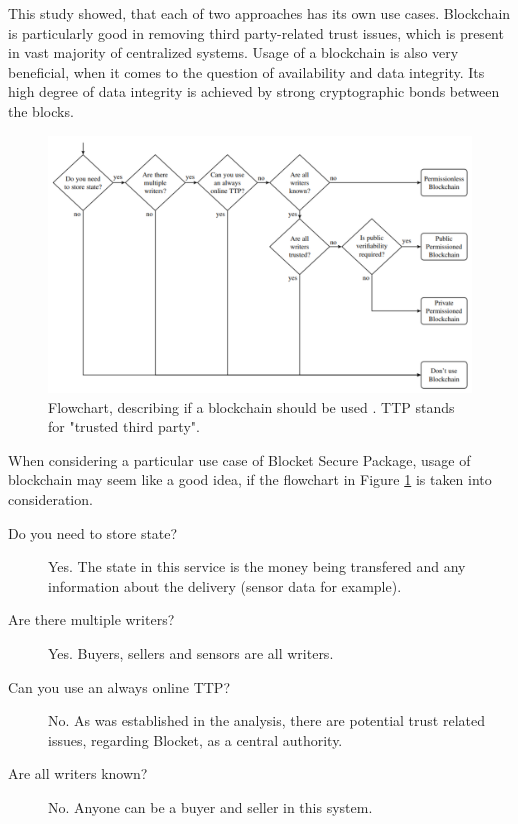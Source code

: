 This study showed, that each of two approaches has its own use cases. Blockchain is particularly good in removing third party-related trust issues, which is present in vast majority of centralized systems. Usage of a blockchain is also very beneficial, when it comes to the question of availability and data integrity. Its high degree of data integrity is achieved by strong cryptographic bonds between the blocks.

\begin{figure}[H]
\centering
\includegraphics[scale=0.54]{images/blockchainusecase.png}
\caption{Flowchart, describing if a blockchain should be used \textnormal{\citep{wust2017you}}. TTP stands for "trusted third party".}
\label{fig:blockchainuse}
\end{figure}

When considering a particular use case of Blocket Secure Package, usage of blockchain may seem like a good idea, if the flowchart in Figure \ref{fig:blockchainuse} is taken into consideration.

\begin{description}
\item[Do you need to store state?] 
Yes. The state in this service is the money being transfered and any information about the delivery (sensor data for example).
\item[Are there multiple writers?]
Yes. Buyers, sellers and sensors are all writers.
\item[Can you use an always online TTP?] No. As was established in the analysis, there are potential trust related issues, regarding Blocket, as a central authority.
\item[Are all writers known?] No. Anyone can be a buyer and seller in this system.
\end{description}

